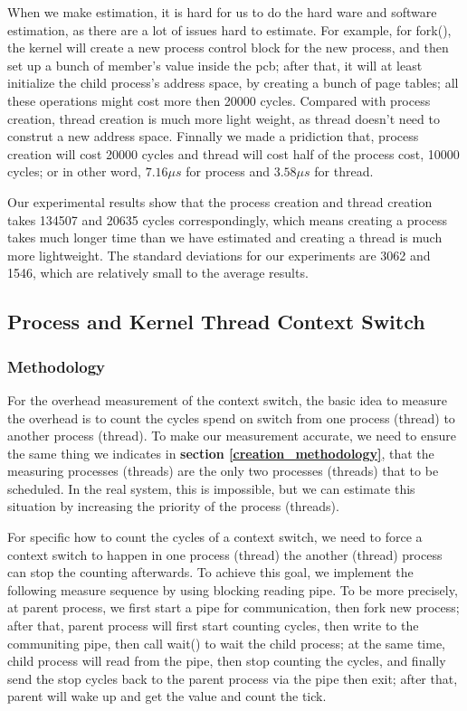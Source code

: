 When we make estimation, it is hard for us to do the hard ware and software estimation, as there are a lot of issues hard to estimate. For example, for fork(), the kernel will create a new process control block for the new process, and then set
up a bunch of member's value inside the pcb; after that, it will at least initialize the child process's address space, by creating a bunch of page tables; all these operations might cost more then 20000 cycles. Compared with process creation,
thread creation is much more light weight, as thread doesn't need to construt a new address space. Finnally we made a pridiction that, process creation will cost 20000 cycles and thread will cost half of the process cost, 10000 cycles; or in other
word, $7.16 \mu s$ for process and $3.58 \mu s$ for thread.

Our experimental results show that the process creation and thread creation takes 134507 and 20635 cycles correspondingly, which means creating a process takes much longer time than we have estimated and creating a thread is much more lightweight. The standard deviations for our experiments are 3062 and 1546, which are relatively small to the average results.


\subsection{Process and Kernel Thread Context Switch}

\subsubsection{Methodology}

For the overhead measurement of the context switch, the basic idea to measure the overhead is to count the cycles spend on switch from one process (thread) to another process (thread). To make our measurement accurate, we need to ensure the same thing we indicates in
\textbf{section \ref{creation_methodology}}, that the measuring processes (threads) are the only two processes (threads) that to be scheduled. In the real system, this is impossible, but we can estimate this situation by increasing the priority of the process (threads).

For specific how to count the cycles of a context switch, we need to force a context switch to happen in one process (thread) the another (thread) process can stop the counting afterwards. To achieve this goal, we implement the following measure sequence by using blocking
reading pipe. To be more precisely, at parent process, we first start a pipe for communication, then fork new process; after that, parent process will first start counting cycles, then write to the communiting pipe, then call wait() to wait the child process; at the same time, child process will read from the pipe, then stop counting the cycles, and finally send the stop cycles back to the parent process via the pipe then exit; after that, parent will wake up and get the value and count the tick.

